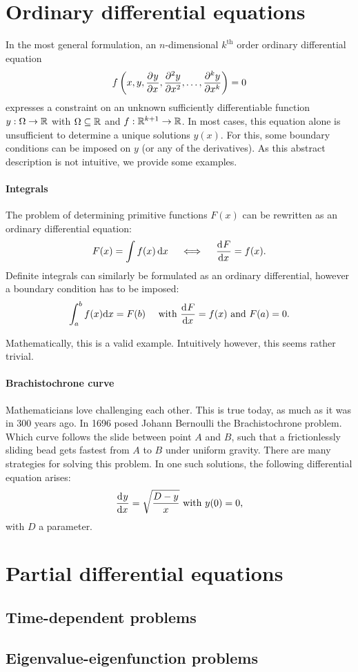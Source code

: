 \section{Ordinary differential equations}

In the most general formulation, an $n$-dimensional $k^\text{th}$ order ordinary differential equation 
$$
f\left(x, y, {\pdv[]{y}{x}}, {\pdv[2]{y}{x}}, \dots, {\pdv[k]{y}{x}}\right) = 0
$$
expresses a constraint on an unknown sufficiently differentiable function $y : \Omega \to \mathbb{R}$ with $\Omega \subseteq \mathbb{R}$ and $f: \mathbb{R}^{k+1} \to \mathbb{R}$. In most cases, this equation alone is unsufficient to determine a unique solutions $y(x)$. For this, some boundary conditions can be imposed on $y$ (or any of the derivatives). As this abstract description is not intuitive, we provide some examples.

\paragraph{Integrals} The problem of determining primitive functions $F(x)$ can be rewritten as an ordinary differential equation:
$$
F(x) = \int f(x) \,\dd x \quad \iff \quad \dv[]{F}{x} = f(x)\text{.}
$$
Definite integrals can similarly be formulated as an ordinary differential, however a boundary condition has to be imposed:
$$
\int_a^b f(x) \dd x = F(b) \quad \text{ with } \dv[]{F}{x} = f(x) \text{ and } F(a) = 0\text{.}
$$

Mathematically, this is a valid example. Intuitively however, this seems rather trivial.

\paragraph{Brachistochrone curve} Mathematicians love challenging each other. This is true today, as much as it was in 300 years ago. In 1696 posed Johann Bernoulli the Brachistochrone problem. Which curve follows the slide between point $A$ and $B$, such that a frictionlessly sliding bead gets fastest from $A$ to $B$ under uniform gravity. There are many strategies for solving this problem. In one such solutions, the following differential equation arises:
$$
{\dv[]{y}{x}} = \sqrt{\frac{D - y}{x}} \text{ with $y(0) = 0$,}
$$
with $D$ a parameter.




\section{Partial differential equations}

\subsection{Time-dependent problems}

\subsection{Eigenvalue-eigenfunction problems}

\stopchapter
